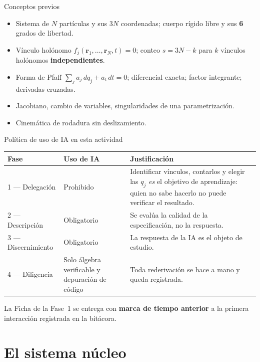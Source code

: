 \documentclass[10pt,aspectratio=169]{beamer}
\newcommand{\rv}{\mathbf{r}}
\begin{document}
\begin{frame}{Conceptos previos}
  \begin{itemize}
    \item Sistema de $N$ partículas y sus $3N$ coordenadas; cuerpo rígido libre y sus \textbf{6} grados de libertad.
    \item Vínculo holónomo $f_j(\rv_1,\dots,\rv_N,t)=0$; conteo $s=3N-k$ para $k$ vínculos holónomos \textbf{independientes}.
    \item Forma de Pfaff $\sum_j a_j\,dq_j+a_t\,dt=0$; diferencial exacta; factor integrante; derivadas cruzadas.
    \item Jacobiano, cambio de variables, singularidades de una parametrización.
    \item Cinemática de rodadura sin deslizamiento.
  \end{itemize}
\end{frame}

\begin{frame}{Política de uso de IA en esta actividad}
  \small
  \begin{table}
  \begin{tabular}{@{}p{3.1cm}p{2.9cm}p{7.4cm}@{}}
    \toprule
    \textbf{Fase} & \textbf{Uso de IA} & \textbf{Justificación} \\
    \midrule
    1 --- Delegación & \alert{Prohibido} & Identificar vínculos, contarlos y elegir las $q_j$ \emph{es} el objetivo de aprendizaje: quien no sabe hacerlo no puede verificar el resultado. \\
    2 --- Descripción & Obligatorio & Se evalúa la calidad de la especificación, no la respuesta. \\
    3 --- Discernimiento & Obligatorio & La respuesta de la IA es el objeto de estudio. \\
    4 --- Diligencia & Solo álgebra verificable y depuración de código & Toda rederivación se hace a mano y queda registrada. \\
    \bottomrule
  \end{tabular}
  \end{table}
  \vspace{0.2em}
  La Ficha de la Fase~1 se entrega con \textbf{marca de tiempo anterior} a la primera interacción registrada en la bitácora.
\end{frame}

\section{El sistema núcleo}
\end{document}
